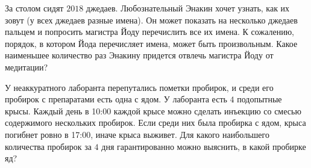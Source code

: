 \begin{problem}
	За столом сидят $2018$ джедаев. Любознательный Энакин хочет узнать, как их зовут (у всех джедаев разные имена). Он может показать на несколько джедаев пальцем и попросить магистра Йоду перечислить все их имена. К сожалению, порядок, в котором Йода перечисляет имена, может быть произвольным. Какое наименьшее количество раз Энакину придется отвлечь магистра Йоду от медитации?
\end{problem}

\begin{problem}
	У неаккуратного лаборанта перепутались пометки пробирок, и среди его пробирок с препаратами есть одна с ядом. У лаборанта есть $4$ подопытные крысы. Каждый день в 10:00 каждой крысе можно сделать инъекцию со смесью содержимого нескольких пробирок. Если среди них была пробирка с ядом, крыса погибнет ровно в 17:00, иначе крыса выживет. Для какого наибольшего количества пробирок за $4$ дня гарантированно можно выяснить, в какой пробирке яд?
\end{problem}

